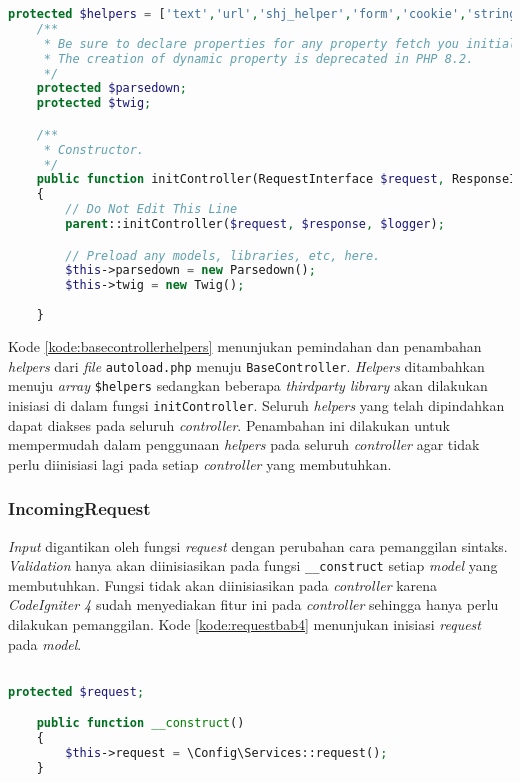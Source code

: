 \begin{lstlisting}[language=PHP, caption=Penambahan sintaks pada \texttt{BaseController}, label=kode:basecontrollerhelpers]
	protected $helpers = ['text','url','shj_helper','form','cookie','string','filesystem'];
	/**
     * Be sure to declare properties for any property fetch you initialized.
     * The creation of dynamic property is deprecated in PHP 8.2.
     */
    protected $parsedown;
    protected $twig;

    /**
     * Constructor.
     */
    public function initController(RequestInterface $request, ResponseInterface $response, LoggerInterface $logger)
    {
        // Do Not Edit This Line
        parent::initController($request, $response, $logger);

        // Preload any models, libraries, etc, here.
        $this->parsedown = new Parsedown();
        $this->twig = new Twig();
        
    }
\end{lstlisting}

Kode \ref{kode:basecontrollerhelpers} menunjukan pemindahan dan penambahan \textit{helpers} dari \textit{file} \texttt{autoload.php} menuju \texttt{BaseController}. \textit{Helpers} ditambahkan menuju \textit{array} \texttt{\$helpers} sedangkan beberapa \textit{thirdparty library} akan dilakukan inisiasi di dalam fungsi \texttt{initController}. Seluruh \textit{helpers} yang telah dipindahkan dapat diakses pada seluruh \textit{controller}. Penambahan ini dilakukan untuk mempermudah dalam penggunaan \textit{helpers} pada seluruh \textit{controller} agar tidak perlu diinisiasi lagi pada setiap \textit{controller} yang membutuhkan.

\subsubsection{IncomingRequest}
\textit{Input} digantikan oleh fungsi \textit{request} dengan perubahan cara pemanggilan sintaks. \textit{Validation} hanya akan diinisiasikan pada fungsi \texttt{\_\_construct} setiap \textit{model} yang membutuhkan. Fungsi tidak akan diinisiasikan pada \textit{controller} karena \textit{CodeIgniter 4} sudah menyediakan fitur ini pada \textit{controller} sehingga hanya perlu dilakukan pemanggilan. Kode \ref{kode:requestbab4} menunjukan inisiasi \textit{request} pada \textit{model}.

\begin{lstlisting}[language=PHP, caption=Perancangan inisiasi \textit{request} pada \texttt{\_\_construct}, label=kode:requestbab4]

protected $request;

	public function __construct()
	{
		$this->request = \Config\Services::request(); 
	}
\end{lstlisting}

